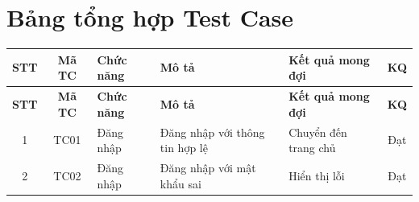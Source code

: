 
\chapter{Bảng tổng hợp Test Case}
\label{app:testcase}


\renewcommand{\arraystretch}{1.3}
\begin{longtable}{|c|c|l|p{4cm}|p{4cm}|c|}
    \hline
    \rowcolor{navyblue!15}
    \textbf{STT} & \textbf{Mã TC} & \textbf{Chức năng} & \textbf{Mô tả} & \textbf{Kết quả mong đợi} & \textbf{KQ} \\
    \hline
    \endfirsthead

    \hline
    \rowcolor{navyblue!15}
    \textbf{STT} & \textbf{Mã TC} & \textbf{Chức năng} & \textbf{Mô tả} & \textbf{Kết quả mong đợi} & \textbf{KQ} \\
    \hline
    \endhead

    1 & TC01 & Đăng nhập & Đăng nhập với thông tin hợp lệ & Chuyển đến trang chủ & Đạt \\
    \hline
    2 & TC02 & Đăng nhập & Đăng nhập với mật khẩu sai & Hiển thị lỗi & Đạt \\
    \hline

\end{longtable}
\renewcommand{\arraystretch}{1.0}
